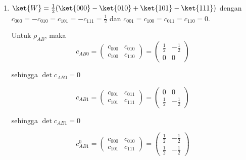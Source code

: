 \begin{enumerate}
	sehingga $\det c_{1BC}^0 = 0$
	
	\begin{equation}
		c_{0BC}^1=
		\begin{pmatrix}
			c_{100} & c_{101} \\
			c_{010} & c_{011}
		\end{pmatrix}=
		\begin{pmatrix}
			\frac{2}{3} & 0 \\
			\frac{1}{3} & 0
		\end{pmatrix}
	\end{equation}
	
	sehingga $\det c_{0BC}^1 = 0$.
	
	Maka
	\begin{equation}
		\mathrm{Tr}\,\rho_{BC}\tilde{\rho}_{BC}=4|\det c_{0BC}|^2=4(-\frac{2}{9})^2=\frac{16}{81}
	\end{equation}
	
	\item { $\ket{W}=\frac{1}{2}(\ket{000}-\ket{010}+\ket{101}-\ket{111})$}
	dengan $c_{000}=-c_{010}=c_{101}=-c_{111}=\frac{1}{2}$ dan $c_{001}=c_{100}=c_{011}=c_{110}=0$.
	
	Untuk $\rho_{AB}$, maka
	\begin{equation}
		c_{AB0}=
		\begin{pmatrix}
			c_{000} & c_{010} \\
			c_{100} & c_{110}
		\end{pmatrix}=
		\begin{pmatrix}
			\frac{1}{2} & -\frac{1}{2} \\
			0 & 0
		\end{pmatrix}
	\end{equation}
	
	sehingga $\det c_{AB0} = 0$
	
	\begin{equation}
		c_{AB1}=
		\begin{pmatrix}
			c_{001} & c_{011} \\
			c_{101} & c_{111}
		\end{pmatrix}=
		\begin{pmatrix}
			0 & 0 \\
			\frac{1}{2} & -\frac{1}{2}
		\end{pmatrix}
	\end{equation}
	
	sehingga $\det c_{AB1} = 0$
	
	\begin{equation}
		c_{AB1}^0=
		\begin{pmatrix}
			c_{000} & c_{010} \\
			c_{101} & c_{111}
		\end{pmatrix}=
		\begin{pmatrix}
			\frac{1}{2} & -\frac{1}{2} \\
			\frac{1}{2} & -\frac{1}{2}
		\end{pmatrix}
	\end{equation}
	

\end{enumerate}
